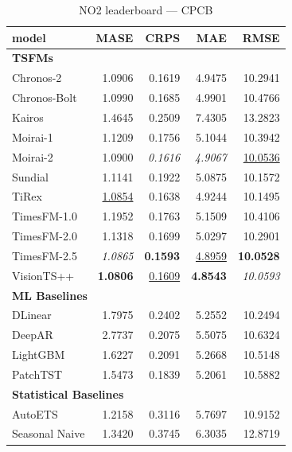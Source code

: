 \begin{table}[H]
\caption{NO2 leaderboard --- CPCB}
\centering
\begin{small}
\begin{tabular}{lrrrr}
\toprule
model & MASE & CRPS & MAE & RMSE \\
\midrule
\multicolumn{5}{l}{\textbf{TSFMs}} \\
Chronos-2 & 1.0906 & 0.1619 & 4.9475 & 10.2941 \\
Chronos-Bolt & 1.0990 & 0.1685 & 4.9901 & 10.4766 \\
Kairos & 1.4645 & 0.2509 & 7.4305 & 13.2823 \\
Moirai-1 & 1.1209 & 0.1756 & 5.1044 & 10.3942 \\
Moirai-2 & 1.0900 & \textit{0.1616} & \textit{4.9067} & \underline{10.0536} \\
Sundial & 1.1141 & 0.1922 & 5.0875 & 10.1572 \\
TiRex & \underline{1.0854} & 0.1638 & 4.9244 & 10.1495 \\
TimesFM-1.0 & 1.1952 & 0.1763 & 5.1509 & 10.4106 \\
TimesFM-2.0 & 1.1318 & 0.1699 & 5.0297 & 10.2901 \\
TimesFM-2.5 & \textit{1.0865} & \textbf{0.1593} & \underline{4.8959} & \textbf{10.0528} \\
VisionTS++ & \textbf{1.0806} & \underline{0.1609} & \textbf{4.8543} & \textit{10.0593} \\
\midrule
\multicolumn{5}{l}{\textbf{ML Baselines}} \\
DLinear & 1.7975 & 0.2402 & 5.2552 & 10.2494 \\
DeepAR & 2.7737 & 0.2075 & 5.5075 & 10.6324 \\
LightGBM & 1.6227 & 0.2091 & 5.2668 & 10.5148 \\
PatchTST & 1.5473 & 0.1839 & 5.2061 & 10.5882 \\
\midrule
\multicolumn{5}{l}{\textbf{Statistical Baselines}} \\
AutoETS & 1.2158 & 0.3116 & 5.7697 & 10.9152 \\
Seasonal Naive & 1.3420 & 0.3745 & 6.3035 & 12.8719 \\
\bottomrule
\end{tabular}
\end{small}
\end{table}
